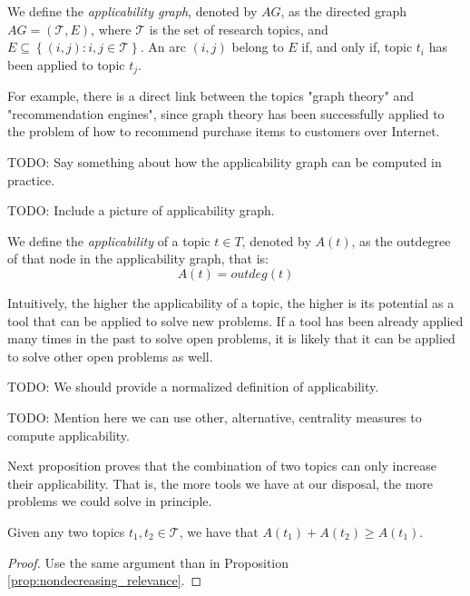 \begin{definition}
\label{def:applicability-graph}
We define the \emph{applicability graph}, denoted by $AG$, as the directed graph $AG = (\mathcal{T}, E)$, where $\mathcal{T}$ is the set of research topics, and $E\subseteq\left\{ (i,j):i,j\in \mathcal{T} \right\} $. An arc $(i, j)$ belong to $E$ if, and only if, topic $t_i$ has been applied to topic $t_j$.
\end{definition}

For example, there is a direct link between the topics "graph theory" and "recommendation engines", since graph theory has been successfully applied to the problem of how to recommend purchase items to customers over Internet.

{\color{red} TODO: Say something about how the applicability graph can be computed in practice.}

{\color{red} TODO: Include a picture of applicability graph.}

\begin{definition}
\label{def:applicability}
We define the \emph{applicability} of a topic $t\in T$, denoted by $A(t)$, as the outdegree of that node in the applicability graph, that is:
\[
A(t) = outdeg(t)
\]
\end{definition}

Intuitively, the higher the applicability of a topic, the higher is its potential as a tool that can be applied to solve new problems. If a tool has been already applied many times in the past to solve open problems, it is likely that it can be applied to solve other open problems as well.

{\color{red} TODO: We should provide a normalized definition of applicability.}

{\color{red} TODO: Mention here we can use other, alternative, centrality measures to compute applicability.}

Next proposition proves that the combination of two topics can only increase their applicability. That is, the more tools we have at our disposal, the more problems we could solve in principle.

\begin{proposition}
Given any two topics $t_1, t_2 \in \mathcal{T}$, we have that $A(t_1) + A(t_2) \geq A(t_1)$.
\end{proposition}
\begin{proof}
Use the same argument than in Proposition \ref{prop:nondecreasing_relevance}.
\end{proof}

